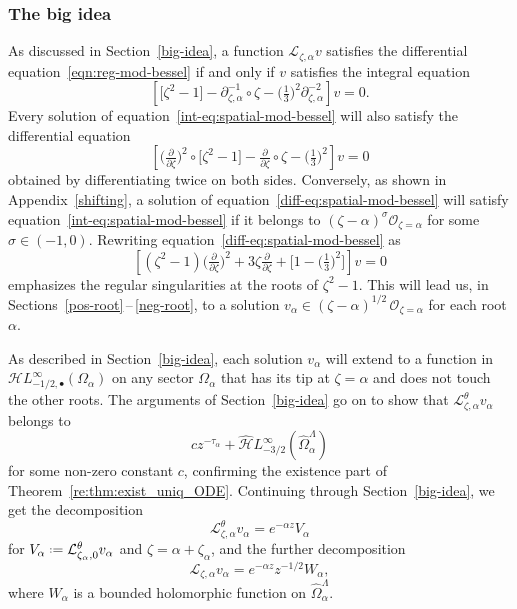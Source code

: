 \documentclass{article}
\newcommand{\singexp}[2]{\mathcal{H}L^\infty_{#1, #2}}
\newcommand{\singexpalg}[1]{\singexp{#1}{\bullet}}
\newcommand{\dualsingexp}[1]{\widehat{\mathcal{H}}L^\infty_{#1}}
\newcommand{\fracderiv}[3]{\partial^{#1}_{#2, #3}}
\newcommand*{\defeq}{\mathrel{\vcenter{\baselineskip0.5ex \lineskiplimit0pt
                     \hbox{\scriptsize.}\hbox{\scriptsize.}}}%
                     =}
\newcommand{\laplace}{\mathcal{L}}
\theoremstyle{definition}
\theoremstyle{plain}
\begin{document}
\subsubsection{The big idea}\label{big-idea-airy}
%
As discussed in Section~\ref{big-idea}, a function $\laplace_{\zeta, \alpha} v$ satisfies the differential equation~\eqref{eqn:reg-mod-bessel} if and only if $v$ satisfies the integral equation
\begin{equation}\label{int-eq:spatial-mod-bessel}
\left[ \big[ \zeta^2 - 1 \big] - \fracderiv{-1}{\zeta}{\alpha} \circ \zeta - \big(\tfrac{1}{3}\big)^2 \fracderiv{-2}{\zeta}{\alpha} \right] v = 0.
\end{equation}
Every solution of equation~\eqref{int-eq:spatial-mod-bessel} will also satisfy the differential equation
\begin{equation}\label{diff-eq:spatial-mod-bessel}
\left[ \big(\tfrac{\partial}{\partial \zeta}\big)^2 \circ \big[ \zeta^2 - 1 \big] - \tfrac{\partial}{\partial \zeta} \circ \zeta - \big(\tfrac{1}{3}\big)^2 \right] v = 0
\end{equation}
obtained by differentiating twice on both sides. Conversely, as shown in Appendix~\ref{shifting}, a solution of equation~\eqref{diff-eq:spatial-mod-bessel} will satisfy equation~\eqref{int-eq:spatial-mod-bessel} if it belongs to $(\zeta - \alpha)^\sigma \mathcal{O}_{\zeta = \alpha}$ for some $\sigma \in (-1, 0)$. Rewriting equation~\eqref{diff-eq:spatial-mod-bessel} as
\[ \left[ (\zeta^2 - 1) \big(\tfrac{\partial}{\partial \zeta}\big)^2 + 3\zeta \tfrac{\partial}{\partial \zeta} + \big[ 1 - \big(\tfrac{1}{3}\big)^2 \big] \right] v = 0 \]
emphasizes the regular singularities at the roots of $\zeta^2 - 1$. This will lead us, in Sections~\ref{pos-root}\,--\,\ref{neg-root}, to a solution $v_\alpha \in (\zeta - \alpha)^{1/2}\,\mathcal{O}_{\zeta = \alpha}$ for each root $\alpha$.

As described in Section~\ref{big-idea}, each solution $v_\alpha$ will extend to a function in $\singexpalg{-1/2}(\Omega_\alpha)$ on any sector $\Omega_\alpha$ that has its tip at $\zeta = \alpha$ and does not touch the other roots. The arguments of Section~\ref{big-idea} go on to show that $\laplace^\theta_{\zeta, \alpha} v_\alpha$ belongs to
\[ cz^{-\tau_\alpha} + \dualsingexp{-3/2}(\widehat{\Omega}_\alpha^\Lambda) \]
for some non-zero constant $c$, confirming the existence part of Theorem~\ref{re:thm:exist_uniq_ODE}. Continuing through Section~\ref{big-idea}, we get the decomposition
\[ \laplace^\theta_{\zeta, \alpha} v_\alpha = e^{-\alpha z} V_\alpha \]
for $V_\alpha \defeq \laplace^\theta_{\zeta_\alpha, 0} v_\alpha$ and $\zeta = \alpha + \zeta_\alpha$, and the further decomposition
\[ \laplace_{\zeta, \alpha} v_\alpha = e^{-\alpha z} z^{-1/2} W_\alpha, \]
where $W_\alpha$ is a bounded holomorphic function on $\widehat{\Omega}_\alpha^\Lambda$.
\end{document}
